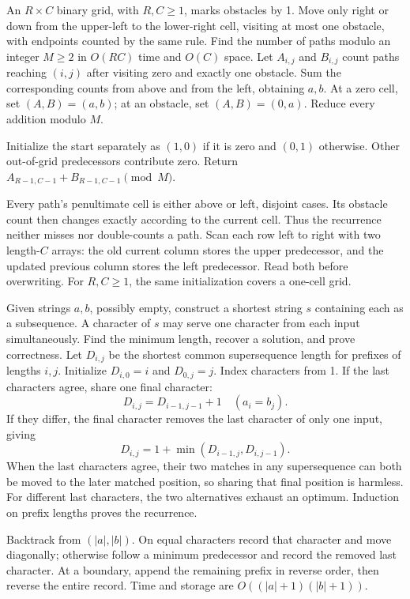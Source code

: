 An $R\times C$ binary grid, with $R,C\ge1$, marks obstacles by 1. Move only right or down from the upper-left to the lower-right cell, visiting at most one obstacle, with endpoints counted by the same rule. Find the number of paths modulo an integer $M\ge2$ in $O(RC)$ time and $O(C)$ space.
\solution Let $A_{i,j}$ and $B_{i,j}$ count paths reaching $(i,j)$ after visiting zero and exactly one obstacle. Sum the corresponding counts from above and from the left, obtaining $a,b$. At a zero cell, set $(A,B)=(a,b)$; at an obstacle, set $(A,B)=(0,a)$. Reduce every addition modulo $M$.

Initialize the start separately as $(1,0)$ if it is zero and $(0,1)$ otherwise. Other out-of-grid predecessors contribute zero. Return $A_{R-1,C-1}+B_{R-1,C-1}\pmod M$.

Every path's penultimate cell is either above or left, disjoint cases. Its obstacle count then changes exactly according to the current cell. Thus the recurrence neither misses nor double-counts a path. Scan each row left to right with two length-$C$ arrays: the old current column stores the upper predecessor, and the updated previous column stores the left predecessor. Read both before overwriting. For $R,C\ge1$, the same initialization covers a one-cell grid.

Given strings $a,b$, possibly empty, construct a shortest string $s$ containing each as a subsequence. A character of $s$ may serve one character from each input simultaneously. Find the minimum length, recover a solution, and prove correctness.
\solution Let $D_{i,j}$ be the shortest common supersequence length for prefixes of lengths $i,j$. Initialize $D_{i,0}=i$ and $D_{0,j}=j$. Index characters from 1. If the last characters agree, share one final character:
\[
D_{i,j}=D_{i-1,j-1}+1\quad(a_i=b_j).
\]
If they differ, the final character removes the last character of only one input, giving
\[
D_{i,j}=1+\min(D_{i-1,j},D_{i,j-1}).
\]
When the last characters agree, their two matches in any supersequence can both be moved to the later matched position, so sharing that final position is harmless. For different last characters, the two alternatives exhaust an optimum. Induction on prefix lengths proves the recurrence.

Backtrack from $(|a|,|b|)$. On equal characters record that character and move diagonally; otherwise follow a minimum predecessor and record the removed last character. At a boundary, append the remaining prefix in reverse order, then reverse the entire record. Time and storage are $O((|a|+1)(|b|+1))$.

